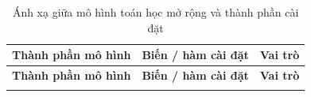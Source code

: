 \documentclass[12pt,a4paper]{article}
\numberwithin{figure}{subsection}
\begin{document}
\begin{center}
\footnotesize
\renewcommand{\arraystretch}{1.25}
\begin{longtable}{|>{\raggedright\arraybackslash}p{3.3cm}|>{\raggedright\arraybackslash}p{3.25cm}|>{\raggedright\arraybackslash}p{7.1cm}|}
\caption{Ánh xạ giữa mô hình toán học mở rộng và thành phần cài đặt}\label{tab:cvrp_vrptw_mapping}\\
\hline
\textbf{Thành phần mô hình} & \textbf{Biến / hàm cài đặt} & \textbf{Vai trò} \\
\hline
\endfirsthead

\hline
\textbf{Thành phần mô hình} & \textbf{Biến / hàm cài đặt} & \textbf{Vai trò} \\
\hline
\endhead

\hline
\endfoot

\hline
\endlastfoot


\end{longtable}
\end{center}
\end{document}
